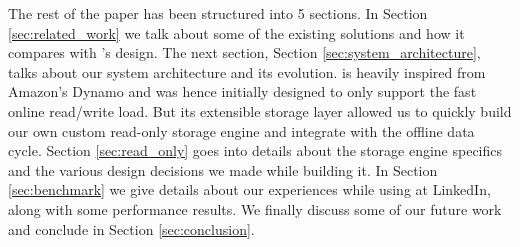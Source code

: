 The rest of the paper has been structured into 5 sections. In Section \ref{sec:related_work} we talk about some of the existing solutions and how it compares with \projectname{}'s design. The next section, Section \ref{sec:system_architecture},  talks about our system architecture and its evolution. \projectname{} is heavily inspired from Amazon's Dynamo\cite{dynamo} and was hence initially designed to only support the fast online read/write load. But its extensible storage layer allowed us to quickly build our own custom read-only storage engine and integrate with the offline data cycle. Section \ref{sec:read_only} goes into details about the storage engine specifics and the various design decisions we made while building it. In Section \ref{sec:benchmark} we give details about our experiences while using \projectname{} at LinkedIn, along with some performance results. We finally discuss some of our future work and conclude in Section \ref{sec:conclusion}.